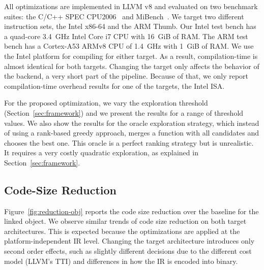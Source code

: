 All optimizations are implemented in LLVM v8 and evaluated on two benchmark suites: the C/C++ SPEC CPU2006~\cite{spec} and MiBench~\cite{mibench01}.
We target two different instruction sets, the Intel x86-64 and the ARM Thumb. Our Intel test bench has a quad-core 3.4~GHz Intel Core i7 CPU with 16~GiB of RAM.
The ARM test bench has a Cortex-A53 ARMv8 CPU of 1.4~GHz with 1~GiB of RAM.
We use the Intel platform for compiling for either target. As a result, compilation-time is almost
identical for both targets. Changing the target only affects the behavior of the backend, a very
short part of the pipeline. Because of that, we only report compilation-time overhead results for
one of the targets, the Intel ISA.

For the proposed optimization, we vary the exploration threshold (Section~\ref{sec:framework})
and we present the results for a range of threshold values. We also show the results for the oracle exploration strategy, which
instead of using a rank-based greedy approach, merges a function with all candidates and chooses the best one.
This oracle is a perfect ranking strategy but is unrealistic. It requires a very costly quadratic exploration, as explained in
Section~\ref{sec:framework}. 

\subsection{Code-Size Reduction}

Figure~\ref{fig:reduction-obj} reports the code size reduction over the baseline for the linked object. %
We observe similar trends of code size reduction on both target architectures. This is expected because the
optimizations are applied at the platform-independent IR level. Changing the target architecture introduces only second order effects,
such as slightly different decisions due to the different cost model (LLVM's TTI) and differences in how the IR is encoded into binary.

